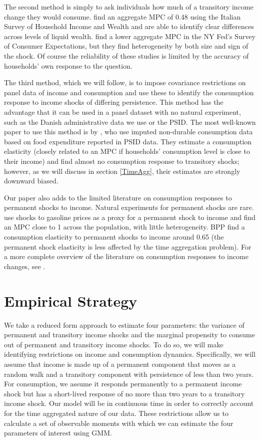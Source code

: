 \documentclass[titlepage]{\econtex}\newcommand{\texname}{ConsumptionHeterogeneity}
\begin{document}
	The second method is simply to ask individuals how much of a transitory income change they would consume. \cite{jappelli_fiscal_2014} find an aggregate MPC of 0.48 using the Italian Survey of Household Income and Wealth and are able to identify clear differences across levels of liquid wealth. \cite{fuster_what_2018} find a lower aggregate MPC in the NY Fed's Survey of Consumer Expectations, but they find heterogeneity by both size and sign of the shock. Of course the reliability of these studies is limited by the accuracy of households' own response to the question.
	
	The third method, which we will follow, is to impose covariance restrictions on panel data of income and consumption and use these to identify the consumption response to income shocks of differing persistence. This method has the advantage that it can be used in a panel dataset with no natural experiment, such as the Danish administrative data we use or the PSID. The most well-known paper to use this method is by \cite{blundell_consumption_2008}, who use imputed non-durable consumption data based on food expenditure reported in PSID data. They estimate a consumption elasticity (closely related to an MPC if households' consumption level is close to their income) and find almost no consumption response to transitory shocks; however, as we will discuss in section \ref{TimeAgg}, their estimates are strongly downward biased.
	
	Our paper also adds to the limited literature on consumption responses to permanent shocks to income. Natural experiments for permanent shocks are rare. \cite{gelman_response_2016} use shocks to gasoline prices as a proxy for a permanent shock to income and find an MPC close to 1 across the population, with little heterogeneity. BPP find a consumption elasticity to permanent shocks to income around 0.65 (the permanent shock elasticity is less affected by the time aggregation problem). For a more complete overview of the literature on consumption responses to income changes, see \cite{jappelli_consumption_2010}.
	
	\section{Empirical Strategy} \label{empirical_strategy} 
	We take a reduced form approach to estimate four parameters: the variance of permanent and transitory income shocks and the marginal propensity to consume out of permanent and transitory income shocks. To do so, we will make identifying restrictions on income and consumption dynamics. Specifically, we will assume that income is made up of a permanent component that moves as a random walk and a transitory component with persistence of less than two years. For consumption, we assume it responds permanently to a permanent income shock but has a short-lived response of no more than two years to a transitory income shock. Our model will be in continuous time in order to correctly account for the time aggregated nature of our data. These restrictions allow us to calculate a set of observable moments with which we can estimate the four parameters of interest using GMM.
	
\end{document}
